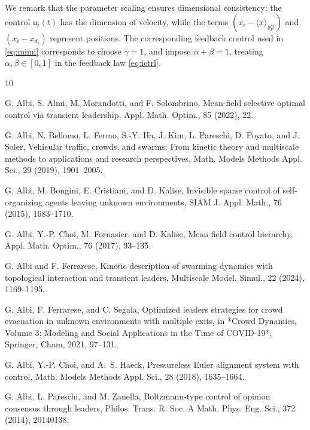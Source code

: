 \documentclass[10pt, reqno]{amsart}
\theoremstyle{definition}
\theoremstyle{remark}
\numberwithin{equation}{section}
\newcommand{\U}{\mathsf{u}}
\begin{document}
We remark that the parameter scaling ensures dimensional consistency: the control $\U_i(t)$ has the dimension of velocity, while the terms $(x_i - \langle x \rangle_{\varrho_F^M})$ and $(x_i - x_{d_i})$ represent positions. The corresponding feedback control used in \eqref{eq:mimi} corresponds to choose $\gamma = 1$, and impose $\alpha + \beta = 1$, treating $\alpha,\beta \in [0,1]$ in the feedback law \eqref{eq:ictrl}.


%
%
%
%
%


%
%
%
%
%
 




\begin{thebibliography}{10}

 G. Albi, S. Almi, M. Morandotti, and F. Solombrino, Mean-field selective optimal control via transient leadership, Appl. Math. Optim., 85 (2022), 22.

 G. Albi, N. Bellomo, L. Fermo, S.-Y. Ha, J. Kim, L. Pareschi, D. Poyato, and J. Soler, Vehicular traffic, crowds, and swarms: From kinetic theory and multiscale methods to applications and research perspectives, Math. Models Methods Appl. Sci., 29 (2019), 1901--2005.

 G. Albi, M. Bongini, E. Cristiani, and D. Kalise, Invisible sparse control of self-organizing agents leaving unknown environments, SIAM J. Appl. Math., 76 (2015), 1683--1710.

 G. Albi, Y.-P. Choi, M. Fornasier, and D. Kalise, Mean field control hierarchy, Appl. Math. Optim., 76 (2017), 93--135.

 G. Albi and F. Ferrarese, Kinetic description of swarming dynamics with topological interaction and transient leaders, Multiscale Model. Simul., 22 (2024), 1169--1195.

 G. Albi, F. Ferrarese, and C. Segala, Optimized leaders strategies for crowd evacuation in unknown environments with multiple exits, in *Crowd Dynamics, Volume 3: Modeling and Social Applications in the Time of COVID-19*, Springer, Cham, 2021, 97--131.

 G. Albi, Y.-P. Choi, and A.~S. Haeck, Pressureless Euler alignment system with control, Math. Models Methods Appl. Sci., 28 (2018), 1635--1664.


 G. Albi, L. Pareschi, and M. Zanella, Boltzmann-type control of opinion consensus through leaders, Philos. Trans. R. Soc. A Math. Phys. Eng. Sci., 372 (2014), 20140138.


\end{thebibliography}
\end{document}
